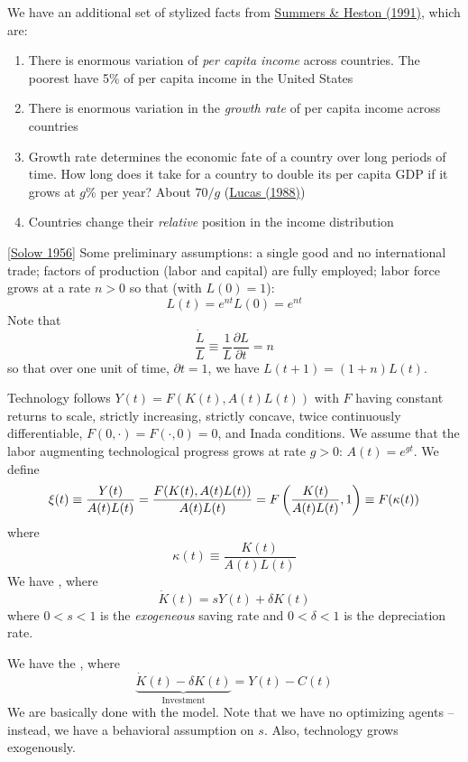 \documentclass[10pt]{article}
\begin{document}
We have an additional set of stylized facts from \href{https://www.rug.nl/ggdc/productivity/pwt/related-research-papers/summershestonmark5_1991.pdf}{Summers \& Heston (1991)}, which are:
\begin{enumerate}
	\item There is enormous variation of \emph{per capita income} across countries. The poorest have 5\% of per capita income in the United States
	\item There is enormous variation in the \emph{growth rate} of per capita income across countries
	\item Growth rate determines the economic fate of a country over long periods of time. How long does it take for a country to double its per capita GDP if it grows at $g$\% per year? About $70 / g$ (\href{https://www.parisschoolofeconomics.eu/docs/darcillon-thibault/lucasmechanicseconomicgrowth.pdf}{Lucas (1988)})
	\item Countries change their \emph{relative} position in the income distribution
\end{enumerate}

\begin{model}
	 \href{http://piketty.pse.ens.fr/files/oldfichiers051211/enseig/ecoineg/articl/Solow1956.pdf}{[Solow 1956]} Some preliminary assumptions: a single good and no international trade; factors of production (labor and capital) are fully employed; labor force grows at a rate $n > 0$ so that (with $L(0) = 1$):
	\[
	L(t) = e^{nt}L(0) = e^{nt}
	\]
	Note that
	\[
	\frac{\dot{L}}{L} \equiv \frac{1}{L} \frac{\partial L}{\partial t} = n
	\]
	so that over one unit of time, $\partial t = 1$, we have $L(t+1) = (1+n) L(t)$.
	
	Technology follows $Y(t) = F(K(t),A(t)L(t))$ with $F$ having constant returns to scale, strictly increasing, strictly concave, twice continuously differentiable, $F(0,\cdot) = F(\cdot,0) = 0$, and Inada conditions. We assume that the labor augmenting technological progress grows at rate $g > 0$: $A(t) = e^{gt}$. We define
	\[
	\xi(t) \equiv \frac{Y(t)}{A(t)L(t)} = \frac{F(K(t),A(t)L(t))}{A(t)L(t)} = F\left( \frac{K(t)}{A(t)L(t)},1\right) \equiv F(\kappa(t))
	\]
	where
	\[
	\kappa(t) \equiv \frac{K(t)}{A(t)L(t)}
	\]
	We have , where
	\[
	\dot{K}(t) = sY(t) + \delta K(t)
	\]
	where $0 < s < 1$ is the \emph{exogeneous} saving rate and $0 < \delta < 1$ is the depreciation rate. 
	
	We have the , where
	\[
	\underbrace{\dot{K}(t) - \delta K(t)}_{\text{Investment}} = Y(t) - C(t)
	\]
	We are basically done with the model. Note that we have no optimizing agents -- instead, we have a behavioral assumption on $s$. Also, technology grows exogenously.
\end{model}
\end{document}
